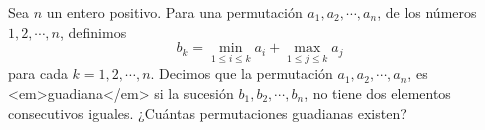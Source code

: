 Sea $n$ un entero positivo. Para una permutación $a_1, a_2, \cdots , a_n$, de los números $1,2, \cdots , n$, definimos
\[ b_k = \min_{1 \leq i \leq k} a_i + \max_{1 \leq j \leq k} a_j \]
para cada $k = 1,2, \cdots ,n$. Decimos que la permutación $a_1, a_2, \cdots , a_n$, es <em>guadiana</em> si la sucesión $b_1, b_2, \cdots, b_n$, no tiene dos elementos consecutivos iguales. ¿Cuántas permutaciones guadianas existen?
